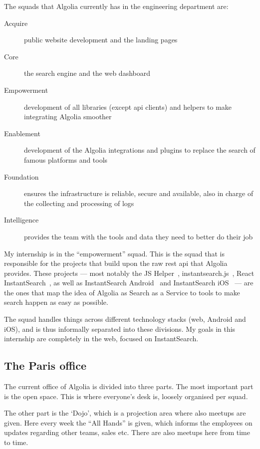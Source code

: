 The squads that Algolia currently has in the engineering department are:

\begin{description}
  \item[Acquire] public website development and the landing pages
  \item[Core] the search engine and the web dashboard
  \item[Empowerment] development of all libraries (except \acrshort{api} clients) and helpers to make integrating Algolia smoother
  \item[Enablement] development of the Algolia integrations and plugins to replace the search of famous platforms and tools
  \item[Foundation] ensures the infrastructure is reliable, secure and available, also in charge of the collecting and processing of logs
  \item[Intelligence] provides the team with the tools and data they need to better do their job
\end{description}

My internship is in the ``empowerment'' squad. This is the squad that is responsible for the projects that build upon the raw \acrshort{rest} \acrshort{api} that Algolia provides. These projects --- most notably the JS Helper~\cite{algolia-js-helper}, instantsearch.js~\cite{instantsearch-js}, React InstantSearch~\cite{react-instantsearch}, as well as InstantSearch Android~\cite{instantsearch-android} and InstantSearch iOS~\cite{instantsearch-ios} --- are the ones that map the idea of Algolia as Search as a Service to tools to make search happen as easy as possible.

The squad handles things across different technology stacks (web, Android and iOS), and is thus informally separated into these divisions. My goals in this internship are completely in the web, focused on InstantSearch.

\subsection{The Paris office} %
\label{ssec:the_paris_office}

The current office of Algolia is divided into three parts. The most important part is the open space. This is where everyone's desk is, loosely organised per squad.

The other part is the `Dojo', which is a projection area where also meetups are given. Here every week the ``All Hands'' is given, which informs the employees on updates regarding other teams, sales etc. There are also meetups here from time to time.


